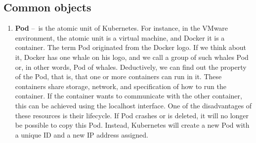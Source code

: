 \subsection{Common objects}
\label{objects}

\begin{enumerate}[itemsep=1mm, parsep=0pt]
    \item \textbf{Pod} \---\ is the atomic unit of Kubernetes.
    For instance, in the VMware environment, the atomic unit is a virtual machine, and Docker it is a container.
    The term Pod originated from the Docker logo.
    If we think about it, Docker has one whale on his logo, and we call a group of such whales Pod or, in other words, Pod of whales.
    Deductively, we can find out the property of the Pod, that is, that one or more containers can run in it.
    These containers share storage, network, and specification of how to run the container.
    If the container wants to communicate with the other container, this can be achieved using the localhost interface.
    One of the disadvantages of these resources is their lifecycle.
    If Pod crashes or is deleted, it will no longer be possible to copy this Pod.
    Instead, Kubernetes will create a new Pod with a unique ID and a new IP address assigned.


\end{enumerate}

